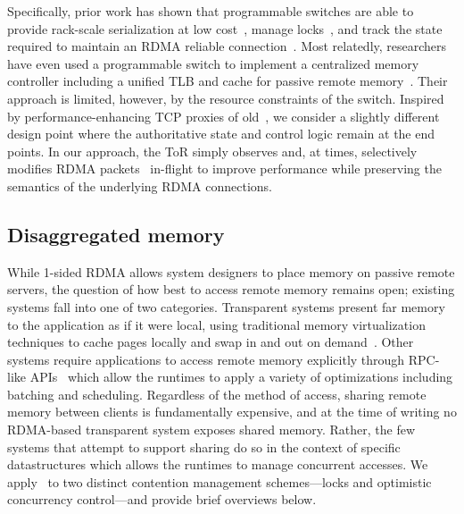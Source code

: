 Specifically, prior work has shown that programmable switches are able
to provide rack-scale serialization at low
cost~\cite{eris,no,when-computer,Grant2021InContRes}, manage
locks~\cite{netlock}, and track the state required to maintain an
RDMA reliable connection~\cite{tea}.  Most relatedly, researchers have
even used a programmable switch to implement a centralized memory
controller including a unified TLB and cache for passive remote
memory~\cite{mind}.  Their approach is limited, however, by the
resource constraints of the switch.  Inspired by performance-enhancing
TCP proxies of old~\cite{snoop,rfc3135}, we consider a slightly
different design point where the authoritative state and control logic
remain at the end points.  In our approach, the ToR simply observes
and, at times, selectively modifies RDMA
packets~\cite{switchml,Grant2021InContRes} in-flight to improve
performance while preserving the semantics of the underlying RDMA
connections.




\subsection{Disaggregated memory}

While 1-sided RDMA allows system designers to place memory on passive
remote servers, the question of how best to access remote memory
remains open; existing systems fall into one of two categories.
Transparent systems present far memory to the application as if it
were local, using traditional memory virtualization techniques to
cache pages locally and swap in and out on
demand~\cite{ivy,infiniswap, leap, fastswap,legoos}.
Other systems require applications to access remote memory explicitly
through RPC-like APIs~\cite{aifm,reigons,clover,sherman,fasst,fusee} which
allow the runtimes to apply a variety of optimizations including
batching and scheduling.
Regardless of the method of access, sharing remote memory between
clients is fundamentally expensive, and at the time of writing no
RDMA-based transparent system exposes shared memory.  Rather, the few
systems that attempt to support sharing do so in the context of
specific datastructures which allows the runtimes to manage concurrent
accesses.  We apply \sword\ to two distinct
contention management schemes---locks and optimistic concurrency
control---and provide brief overviews below.

